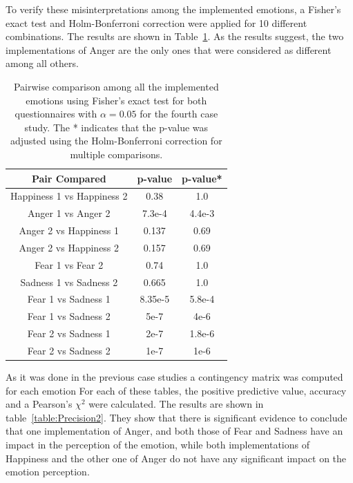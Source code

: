 To verify these misinterpretations among the implemented emotions, a Fisher's exact test and Holm-Bonferroni correction were applied for 10 different combinations. The results are shown in Table~\ref{table:result_compare_fourth}. As the results suggest, the two implementations of Anger are the only ones that were considered as different among all others.

\begin{table}[h]
\centering
\small
\caption{Pairwise comparison among all the implemented emotions using Fisher's exact test for both questionnaires with $\alpha = 0.05$ for the fourth case study. The * indicates that the p-value was adjusted using the Holm-Bonferroni correction for multiple comparisons.}
		\label{table:result_compare_fourth}
		\begin{tabular}{|c|c|c|}
			\hline	
\textbf{Pair Compared} & \textbf{p-value} & \textbf{p-value*}\\	
			\hline
			Happiness 1 vs Happiness 2 &0.38&1.0\\
			\hline
			Anger 1 vs Anger 2 & 7.3e-4&4.4e-3\\
			\hline
			Anger 2 vs Happiness 1 & 0.137&0.69\\
			\hline
			Anger 2 vs Happiness 2 & 0.157&0.69\\
			\hline
			Fear 1 vs Fear 2 & 0.74&1.0\\
			\hline
			Sadness 1 vs Sadness 2 & 0.665&1.0\\
			\hline
			Fear 1 vs Sadness 1& 8.35e-5&5.8e-4\\
			\hline
			Fear 1 vs Sadness 2 & 5e-7&4e-6\\
			\hline
			Fear 2 vs Sadness 1 & 2e-7&1.8e-6\\
			\hline
			Fear 2 vs Sadness 2 & 1e-7&1e-6\\
			\hline
			\end{tabular}
\end{table}
 
As it was done in the previous case studies a contingency matrix was computed for each emotion 
For each of these tables, the positive predictive value, accuracy and a Pearson's $\chi^2$ were calculated. The results are shown in table~\ref{table:Precision2}. They show that there is significant evidence to conclude that one implementation of Anger, and both those of Fear and Sadness have an impact in the perception of the emotion, while both implementations of Happiness and the other one of Anger do not have any significant impact on the emotion perception.

